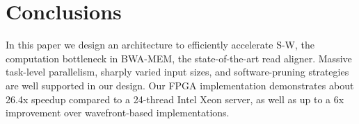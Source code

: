 \section{Conclusions} 
\label{sec:conclusions}
In this paper we design an architecture to efficiently accelerate S-W, the computation bottleneck in BWA-MEM, the state-of-the-art read aligner. 
Massive task-level parallelism, sharply varied input sizes, and software-pruning strategies are well supported in our design. 
Our FPGA implementation demonstrates about 26.4x speedup compared to a 24-thread Intel Xeon server, as well as up to a 6x improvement over wavefront-based implementations. 


\vspace{-5pt}
